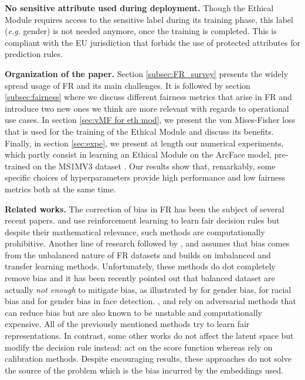\documentclass[nohyperref]{article}
\theoremstyle{plain}
\theoremstyle{definition}
\theoremstyle{remark}
\begin{document}
{\bf No sensitive attribute used during deployment.} Though the Ethical Module requires access to the sensitive label during its training phase, this label ({\it e.g.} gender) is not needed anymore, once the training is completed. This is compliant with the EU jurisdiction that forbids the use of protected attributes for prediction rules.

{\bf Organization of the paper.} Section \ref{subsec:FR_survey} presents the widely spread usage of FR and its main challenges. It is followed by section \ref{subsec:fairness} where we discuss different fairness metrics that arise in FR and introduce two new ones we think are more relevant with regards to operational use cases. In section \ref{sec:vMF for eth mod}, we present the von Mises-Fisher loss that is used for the training of the Ethical Module and discuss its benefits. Finally, in section \ref{sec:expe}, we present at length our numerical experiments, which partly consist in learning an Ethical Module on the ArcFace model, pre-trained on the MS1MV3 dataset \cite{ms1m_retinaface}. Our results show that, remarkably, some specific choices of hyperparameters provide high performance and low fairness metrics both at the same time.

{\bf Related works.} The correction of bias in FR has been the subject of several recent papers. \cite{fairloss_RL} and \cite{mitigating_bias_RL} use reinforcement learning to learn fair decision rules but despite their mathematical relevance, such methods are computationally prohibitive. Another line of research followed by \cite{transfer_learning_FR}, \cite{RFW_2019} and \cite{huang2019deep} assumes that bias comes from the unbalanced nature of FR datasets and builds on imbalanced and transfer learning methods. Unfortunately, these methods do dot completely remove bias and it has been recently pointed out that balanced dataset are actually {\it not enough} to mitigate bias, as illustrated by \cite{gender_balanced_data} for gender bias, \cite{race_balanced_data} for racial bias and \cite{balanced_datasets_are_not_enough} for gender bias in face detection. \cite{debface}, \cite{gan_fairness_gender} and \cite{dhar2021pass} rely on adversarial methods that can reduce bias but are also known to be unstable and computationally expensive. All of the previously mentioned methods try to learn fair representations. In contrast, some other works do not affect the latent space but modify the decision rule instead: \cite{terhorst2020post} act on the score function whereas \cite{salvador2021bias} rely on calibration methods. Despite encouraging results, these approaches do not solve the source of the problem which is the bias incurred by the embeddings used. 
\end{document}

